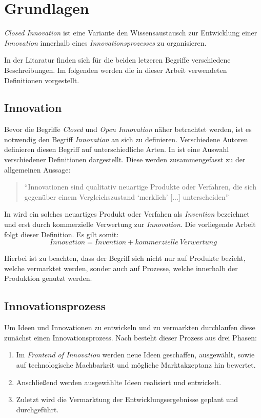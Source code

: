 \section{Grundlagen}\label{sec:grundlagen}
\textit{Closed Innovation} ist eine Variante den Wissensaustausch
zur Entwicklung einer \textit{Innovation}
innerhalb eines \textit{Innovationsprozesses} zu organisieren.

In der Litaratur finden sich für die beiden letzeren Begriffe verschiedene Beschreibungen.
Im folgenden werden die in dieser Arbeit verwendeten Definitionen vorgestellt.

\subsection{Innovation}\label{sec:grundlagen-inno}
Bevor die Begriffe \textit{Closed} und \textit{Open Innovation} näher betrachtet werden,
ist es notwendig den Begriff \textit{Innovation} an sich zu definieren.
Verschiedene Autoren definieren diesen Begriff auf unterschiedliche Arten.
In \cite[5]{hauschildt2016innovationsmanagement} ist eine Auswahl verschiedener Definitionen dargestellt.
Diese werden zusammengefasst zu der allgemeinen Aussage:
\begin{quote}
    \enquote{Innovationen sind qualitativ neuartige Produkte oder Verfahren,
    die sich gegenüber einem Vergleichszustand \enquote{merklich} [...] unterscheiden}
    \cite[4]{hauschildt2016innovationsmanagement}
\end{quote}

In \cite[9]{herzog2011} wird ein solches neuartiges Produkt oder Verfahen als \textit{Invention} bezeichnet und erst durch kommerzielle Verwertung zur \textit{Innovation}.
Die vorliegende Arbeit folgt dieser Definition.
Es gilt somit:
\begin{equation*}
    Innovation = Invention + kommerzielle~Verwertung
\end{equation*}

Hierbei ist zu beachten, dass der Begriff sich nicht nur auf Produkte bezieht, welche vermarktet werden,
sonder auch auf Prozesse, welche innerhalb der Produktion genutzt werden.

\subsection{Innovationsprozess}\label{sec:grundlagen-prozess}
Um Ideen und Innovationen zu entwickeln und zu vermarkten durchlaufen diese zunächst einen Innovationsprozess.
Nach \cite[10\psq]{herzog2011} besteht dieser Prozess aus drei Phasen:
\begin{enumerate}
    \item Im \textit{Frontend of Innovation} werden neue Ideen geschaffen, ausgewählt, sowie auf technologische Machbarkeit und mögliche Marktakzeptanz hin bewertet.
    \item Anschließend werden ausgewählte Ideen realisiert und entwickelt.
    \item Zuletzt wird die Vermarktung der Entwicklungsergebnisse geplant und durchgeführt.
\end{enumerate}

